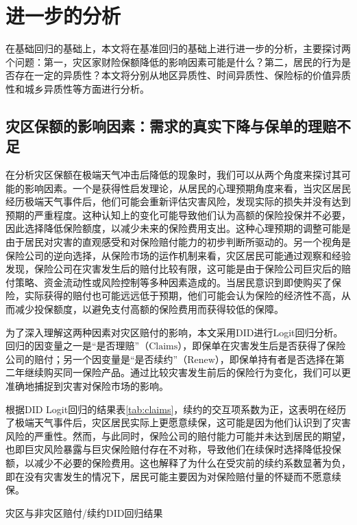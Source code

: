 \chapter{进一步的分析}\label{chap:4.1}
在基础回归的基础上，本文将在基准回归的基础上进行进一步的分析，主要探讨两个问题：第一，灾区家财险保额降低的影响因素可能是什么？第二，居民的行为是否存在一定的异质性？本文将分别从地区异质性、时间异质性、保险标的价值异质性和城乡异质性等方面进行分析。

\section{灾区保额的影响因素：需求的真实下降与保单的理赔不足}

在分析灾区保额在极端天气冲击后降低的现象时，我们可以从两个角度来探讨其可能的影响因素。一个是获得性启发理论\citep{0Do}，从居民的心理预期角度来看，当灾区居民经历极端天气事件后，他们可能会重新评估灾害风险，发现实际的损失并没有达到预期的严重程度。这种认知上的变化可能导致他们认为高额的保险投保并不必要，因此选择降低保险额度，以减少未来的保险费用支出。这种心理预期的调整可能是由于居民对灾害的直观感受和对保险赔付能力的初步判断所驱动的。另一个视角是保险公司的逆向选择，从保险市场的运作机制来看，灾区居民可能通过观察和经验发现，保险公司在灾害发生后的赔付比较有限，这可能是由于保险公司巨灾后的赔付策略、资金流动性或风险控制等多种因素造成的\citep{田玲2009中国财产保险业巨灾损失赔付能力实证研究}。当居民意识到即使购买了保险，实际获得的赔付也可能远远低于预期，他们可能会认为保险的经济性不高，从而减少投保额度，以避免支付高额的保险费用而获得较低的保障。

为了深入理解这两种因素对灾区赔付的影响，本文采用DID进行Logit回归分析。回归的因变量之一是“是否理赔”（$\text{Claims}$），即保单在灾害发生后是否获得了保险公司的赔付；另一个因变量是“是否续约”（$\text{Renew}$），即保单持有者是否选择在第二年继续购买同一保险产品。通过比较灾害发生前后的保险行为变化，我们可以更准确地捕捉到灾害对保险市场的影响。

根据DID Logit回归的结果表\ref{tab:claims}，续约的交互项系数为正，这表明在经历了极端天气事件后，灾区居民实际上更愿意续保，这可能是因为他们认识到了灾害风险的严重性。然而，与此同时，保险公司的赔付能力可能并未达到居民的期望，也即巨灾风险暴露与巨灾保险赔付存在不对称\citep{张旭升2010中国巨灾风险暴露与巨灾保险赔付不对称实证}，导致他们在续保时选择降低投保额，以减少不必要的保险费用。这也解释了为什么在受灾前的续约系数显著为负，即在没有灾害发生的情况下，居民可能主要因为对保险赔付量的怀疑而不愿意续保。

\begin{table}[H]
    \centering
    \caption{灾区与非灾区赔付/续约DID回归结果}\label{tab:claims}
    
\end{table}

